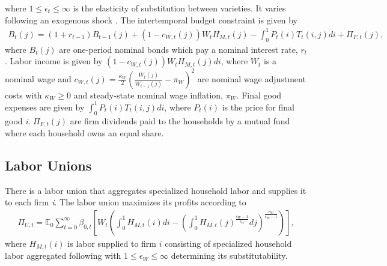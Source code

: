 \documentclass[12pt,3p,authoryear,review]{elsarticle}
\begin{document}
where $1 \le \epsilon_t \le \infty$ is the elasticity of substitution between varieties. It varies following an exogenous shock \citep{ireland_technology_2004}. The intertemporal budget constraint is given by%
\begin{align*}%
 	B_t(j) = \left(1+r_{t-1}\right) B_{t-1}(j) + \left(1-c_{W,t}(j)\right) W_t H_{M,t}(j) - \int_0^1 P_t(i) T_t(i,j) di + \Pi_{F,t}(j),%
\end{align*}%
where $B_t(j)$ are one-period nominal bonds which pay a nominal interest rate, $r_t$. Labor income is given by $\left(1-c_{W,t}(j)\right) W_t H_{M,t}(j) di$, where $W_t$ is a nominal wage and $c_{W,t}(j)= \frac{\kappa_W}{2} \left( \frac{W_{t}(j)}{W_{t-1}(j)} - \pi_W \right)^2$ are nominal wage adjustment costs with $\kappa_W \geq 0$ and steady-state nominal wage inflation, $\pi_W$. Final good expenses are given by $\int_0^1 P_t(i) T_t(i,j) di$, where $P_t(i)$ is the price for final good \textit{i}. $\Pi_{F,t}(j)$ are firm dividends paid to the households by a mutual fund where each household owns an equal share.%
\subsection{Labor Unions}%
There is a labor union that aggregates specialized household labor and supplies it to each firm \textit{i}. The labor union maximizes its profits according to%
\begin{align*}%
	\Pi_{U,t} = \mathbb{E}_0 \sum_{t=0}^{\infty} \beta_{0,t} \left[ W_t \left( \int_0^1 H_{M,t}(i) di - \left( \int_0^1 H_{M,t}(j)^{\frac{\epsilon_W-1}{\epsilon_W}} dj \right)^{\frac{\epsilon_W}{\epsilon_W-1}} \right)   \right],%
\end{align*}%
where $H_{M,t}(i)$ is labor supplied to firm $i$ consisting of specialized household labor aggregated following \cite{dixitMonopolisticCompetitionOptimum1977} with $1\leq\epsilon_W\leq\infty$ determining its substitutability.%
\end{document}
